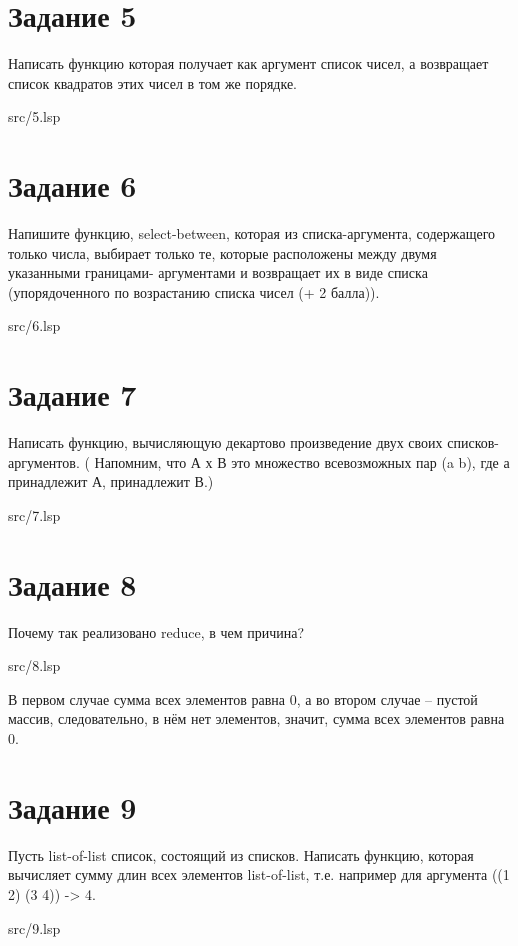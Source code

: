 \section*{Задание 5}
Написать функцию которая получает как аргумент список чисел, а возвращает список
квадратов этих чисел в том же порядке.

\FloatBarrier
\begin{lstinputlisting}[style={lsp}]{src/5.lsp}
\end{lstinputlisting}
\FloatBarrier

\section*{Задание 6}
Напишите функцию, select-between, которая из списка-аргумента, содержащего только
числа, выбирает только те, которые расположены между двумя указанными границами-
аргументами и возвращает их в виде списка (упорядоченного по возрастанию списка чисел
(+ 2 балла)).

\FloatBarrier
\begin{lstinputlisting}[style={lsp}]{src/6.lsp}
\end{lstinputlisting}
\FloatBarrier

\clearpage

\section*{Задание 7}
Написать функцию, вычисляющую декартово произведение двух своих списков-
аргументов. ( Напомним, что А х В это множество всевозможных пар (a b), где а
принадлежит А, принадлежит В.)

\FloatBarrier
\begin{lstinputlisting}[style={lsp}]{src/7.lsp}
\end{lstinputlisting}
\FloatBarrier


\section*{Задание 8}
Почему так реализовано reduce, в чем причина?

\FloatBarrier
\begin{lstinputlisting}[style={lsp}]{src/8.lsp}
\end{lstinputlisting}
\FloatBarrier

В первом случае сумма всех элементов равна 0, а во втором случае -- пустой массив, 
следовательно, в нём нет элементов, значит, сумма всех элементов равна 0.

\section*{Задание 9}
Пусть list-of-list список, состоящий из списков. Написать функцию, которая вычисляет
сумму длин всех элементов list-of-list, т.е. например для аргумента ((1 2) (3 4)) -> 4.

\FloatBarrier
\begin{lstinputlisting}[style={lsp}]{src/9.lsp}
\end{lstinputlisting}
\FloatBarrier